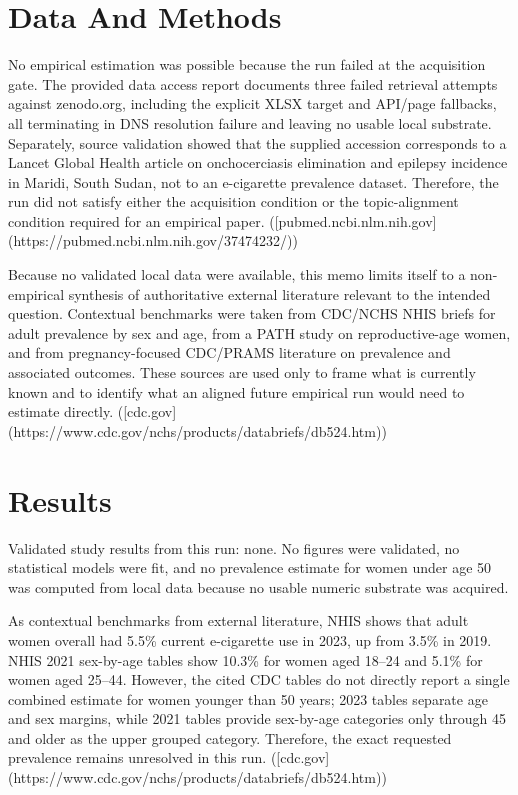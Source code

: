 \documentclass[11pt]{article}
\begin{document}
\section{Data And Methods}
No empirical estimation was possible because the run failed at the acquisition gate. The provided data access report documents three failed retrieval attempts against zenodo.org, including the explicit XLSX target and API/page fallbacks, all terminating in DNS resolution failure and leaving no usable local substrate. Separately, source validation showed that the supplied accession corresponds to a Lancet Global Health article on onchocerciasis elimination and epilepsy incidence in Maridi, South Sudan, not to an e-cigarette prevalence dataset. Therefore, the run did not satisfy either the acquisition condition or the topic-alignment condition required for an empirical paper. ([pubmed.ncbi.nlm.nih.gov](https://pubmed.ncbi.nlm.nih.gov/37474232/))

Because no validated local data were available, this memo limits itself to a non-empirical synthesis of authoritative external literature relevant to the intended question. Contextual benchmarks were taken from CDC/NCHS NHIS briefs for adult prevalence by sex and age, from a PATH study on reproductive-age women, and from pregnancy-focused CDC/PRAMS literature on prevalence and associated outcomes. These sources are used only to frame what is currently known and to identify what an aligned future empirical run would need to estimate directly. ([cdc.gov](https://www.cdc.gov/nchs/products/databriefs/db524.htm))

\section{Results}
Validated study results from this run: none. No figures were validated, no statistical models were fit, and no prevalence estimate for women under age 50 was computed from local data because no usable numeric substrate was acquired.

As contextual benchmarks from external literature, NHIS shows that adult women overall had 5.5\% current e-cigarette use in 2023, up from 3.5\% in 2019. NHIS 2021 sex-by-age tables show 10.3\% for women aged 18–24 and 5.1\% for women aged 25–44. However, the cited CDC tables do not directly report a single combined estimate for women younger than 50 years; 2023 tables separate age and sex margins, while 2021 tables provide sex-by-age categories only through 45 and older as the upper grouped category. Therefore, the exact requested prevalence remains unresolved in this run. ([cdc.gov](https://www.cdc.gov/nchs/products/databriefs/db524.htm))
\end{document}
